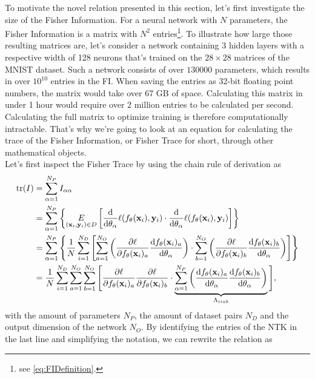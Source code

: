 To motivate the novel relation presented in this section, let's first investigate the size of the Fisher Information. For a neural network with $N$ parameters, the Fisher Information is a matrix with $N^2$ entries\footnote{see \cref{eq:FIDefinition}.}. To illustrate how large those resulting matrices are, let's consider a network containing 3 hidden layers with a respective width of 128 neurons that's trained on the $28\times28$ matrices of the MNIST dataset. Such a network consists of over $130000$ parameters, which results in over $10^{10}$ entries in the FI. When saving the entries as 32-bit floating point numbers, the matrix would take over 67 GB of space. Calculating  this matrix in under 1 hour would require over 2 million entries to be calculated per second. Calculating the full matrix to optimize training is therefore computationally intractable. That's why we're going to look at an equation for calculating the trace of the Fisher Information, or Fisher Trace for short, through other mathematical objects.\\
Let's first inspect the Fisher Trace by using the chain rule of derivation as
\begin{equation}
	\begin{split}
		\mathrm{tr}(I) &= \sum_{\alpha = 1}^{N_P} I_{\alpha\alpha}\\
		&= \sum_{\alpha = 1}^{N_P} \left\{\underset{(\mathbf{x}_i, \mathbf{y}_i) \in D}{E} \left[\frac{\mathrm{d}}{\mathrm{d}\theta_\alpha}\ell(f_\theta(\mathbf{x}_i),\mathbf{y}_i)\cdot \frac{\mathrm{d}}{\mathrm{d}\theta_\alpha}\ell(f_\theta(\mathbf{x}_i),\mathbf{y}_i)\right]\right\}\\
		&= \sum_{\alpha = 1}^{N_P} \left\{ \frac{1}{N} \sum_{i = 1}^{N_D} \left[\sum_{a=1}^{N_O}\left(\frac{\partial\ell}{\partial f_\theta(\mathbf{x}_i)_a}\frac{\mathrm{d}f_\theta(\mathbf{x}_i)_a}{\mathrm{d}\theta_\alpha}\right)\cdot\sum_{b=1}^{N_O}\left(\frac{\partial\ell}{\partial f_\theta(\mathbf{x}_i)_b}\frac{\mathrm{d}f_\theta(\mathbf{x}_i)_b}{\mathrm{d}\theta_\alpha}\right)\right]\right\}\\
		&= \frac{1}{N} \sum_{i = 1}^{N_D} \sum_{a=1}^{N_O} \sum_{b=1}^{N_O} \Bigg[\frac{\partial\ell}{\partial f_\theta(\mathbf{x}_i)_a}\frac{\partial\ell}{\partial f_\theta(\mathbf{x}_i)_b} \cdot\underbrace{ \sum_{\alpha = 1}^{N_P} \left(\frac{\mathrm{d}f_\theta(\mathbf{x}_i)_a}{\mathrm{d}\theta_\alpha}\frac{\mathrm{d}f_\theta(\mathbf{x}_i)_b}{\mathrm{d}\theta_\alpha}\right)}_{\Lambda_{iiab}}\Bigg],
	\end{split} 
\end{equation}
with the amount of parameters $N_P$, the amount of dataset pairs $N_D$ and the output dimension of the network $N_O$. By identifying the entries of the NTK in the last line and simplifying the notation, we can rewrite the relation as
